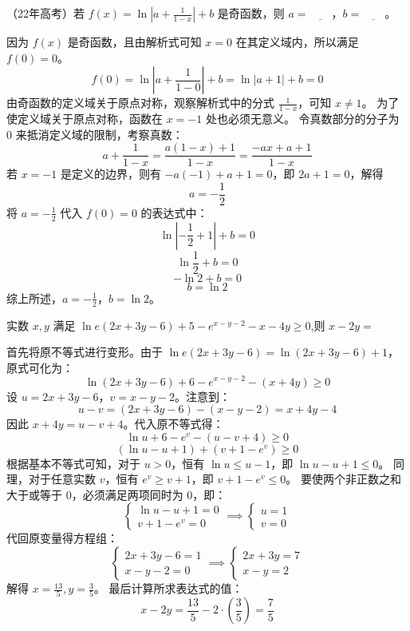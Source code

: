 \begin{questions}
\question
（22年高考）若 $f(x) = \ln \left| a + \frac{1}{1 - x} \right| + b$ 是奇函数，则 $a = \underline{\qquad}$，$b = \underline{\qquad}$。

\begin{solution}
因为 $f(x)$ 是奇函数，且由解析式可知 $x = 0$ 在其定义域内，所以满足 $f(0) = 0$。
\[
f(0) = \ln \left| a + \frac{1}{1 - 0} \right| + b = \ln |a + 1| + b = 0
\]
由奇函数的定义域关于原点对称，观察解析式中的分式 $\frac{1}{1 - x}$，可知 $x \neq 1$。
为了使定义域关于原点对称，函数在 $x = -1$ 处也必须无意义。
令真数部分的分子为 $0$ 来抵消定义域的限制，考察真数：
\[
a + \frac{1}{1 - x} = \frac{a(1 - x) + 1}{1 - x} = \frac{-ax + a + 1}{1 - x}
\]
若 $x = -1$ 是定义的边界，则有 $-a(-1) + a + 1 = 0$，即 $2a + 1 = 0$，解得
\[
a = -\frac{1}{2}
\]
将 $a = -\frac{1}{2}$ 代入 $f(0) = 0$ 的表达式中：
\[
\ln \left| -\frac{1}{2} + 1 \right| + b = 0
\]
\[
\ln \frac{1}{2} + b = 0
\]
\[
-\ln 2 + b = 0
\]
\[
b = \ln 2
\]
综上所述，$a = -\frac{1}{2}$，$b = \ln 2$。
\end{solution}

\question 实数 $x, y$ 满足 $\ln e(2x+3y-6) + 5 - e^{x-y-2} - x - 4y \geq 0$,则 $x-2y =$ \underline{\hspace{1cm}}

\begin{solution}
首先将原不等式进行变形。由于 $\ln e(2x+3y-6) = \ln(2x+3y-6) + 1$，原式可化为：
\[
\ln(2x+3y-6) + 6 - e^{x-y-2} - (x+4y) \geq 0
\]
设 $u = 2x+3y-6$，$v = x-y-2$。注意到：
\[
u - v = (2x+3y-6) - (x-y-2) = x+4y-4
\]
因此 $x+4y = u-v+4$。代入原不等式得：
\[
\ln u + 6 - e^v - (u-v+4) \geq 0
\]
\[
(\ln u - u + 1) + (v + 1 - e^v) \geq 0
\]
根据基本不等式可知，对于 $u > 0$，恒有 $\ln u \leq u-1$，即 $\ln u - u + 1 \leq 0$。
同理，对于任意实数 $v$，恒有 $e^v \geq v+1$，即 $v + 1 - e^v \leq 0$。
要使两个非正数之和大于或等于 0，必须满足两项同时为 0，即：
\[
\begin{cases} \ln u - u + 1 = 0 \\ v + 1 - e^v = 0 \end{cases} \implies \begin{cases} u = 1 \\ v = 0 \end{cases}
\]
代回原变量得方程组：
\[
\begin{cases} 2x+3y-6 = 1 \\ x-y-2 = 0 \end{cases} \implies \begin{cases} 2x+3y = 7 \\ x-y = 2 \end{cases}
\]
解得 $x = \frac{13}{5}, y = \frac{3}{5}$。
最后计算所求表达式的值：
\[
x-2y = \frac{13}{5} - 2 \cdot \left(\frac{3}{5}\right) = \frac{7}{5}
\]
\end{solution}


\end{questions}
